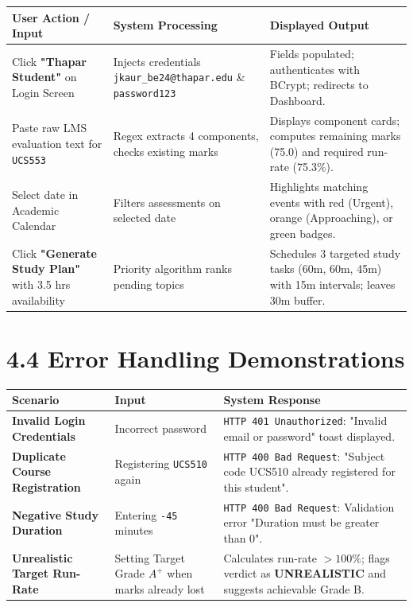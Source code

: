 \documentclass[12pt,a4paper]{report}
\begin{document}
\begin{table}[h!]
\centering
\begin{tabularx}{\textwidth}{|X|X|X|}
\hline
\rowcolor{CodeBorder}
\textbf{User Action / Input} & \textbf{System Processing} & \textbf{Displayed Output} \\ \hline
Click \textbf{"Thapar Student"} on Login Screen & Injects credentials \texttt{jkaur\_be24@thapar.edu} \& \texttt{password123} & Fields populated; authenticates with BCrypt; redirects to Dashboard. \\ \hline
Paste raw LMS evaluation text for \texttt{UCS553} & Regex extracts 4 components, checks existing marks & Displays component cards; computes remaining marks (75.0) and required run-rate (75.3\%). \\ \hline
Select date in Academic Calendar & Filters assessments on selected date & Highlights matching events with red (Urgent), orange (Approaching), or green badges. \\ \hline
Click \textbf{"Generate Study Plan"} with 3.5 hrs availability & Priority algorithm ranks pending topics & Schedules 3 targeted study tasks (60m, 60m, 45m) with 15m intervals; leaves 30m buffer. \\ \hline
\end{tabularx}
\end{table}

\section{4.4 Error Handling Demonstrations}

\begin{table}[h!]
\centering
\begin{tabularx}{\textwidth}{|X|X|X|}
\hline
\rowcolor{CodeBorder}
\textbf{Scenario} & \textbf{Input} & \textbf{System Response} \\ \hline
\textbf{Invalid Login Credentials} & Incorrect password & \texttt{HTTP 401 Unauthorized}: "Invalid email or password" toast displayed. \\ \hline
\textbf{Duplicate Course Registration} & Registering \texttt{UCS510} again & \texttt{HTTP 400 Bad Request}: "Subject code UCS510 already registered for this student". \\ \hline
\textbf{Negative Study Duration} & Entering \texttt{-45} minutes & \texttt{HTTP 400 Bad Request}: Validation error "Duration must be greater than 0". \\ \hline
\textbf{Unrealistic Target Run-Rate} & Setting Target Grade $A^+$ when marks already lost & Calculates run-rate $> 100\%$; flags verdict as \textbf{UNREALISTIC} and suggests achievable Grade B. \\ \hline
\end{tabularx}
\end{table}
\end{document}
